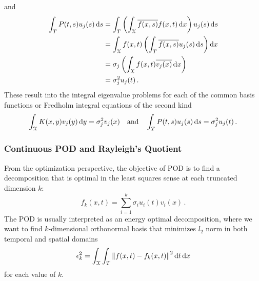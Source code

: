 \documentclass[10pt]{article}
\newcommand{\norm}[1]{\left\Vert#1\right\Vert}
\begin{document}
and
\begin{equation}
\begin{aligned}
    \int_T  P(t,s) {u_j(s)}\, \mathrm{d} s 
    & = 
    \int_T 
    \left(
    \int_{\cal X} \overline{f(x,s)} f(x,t)\, \mathrm{d}x 
    \right) 
    {u_j(s)}\, \mathrm{d} s\\
    & = 
    \int_{\cal X} {f(x,t)}
    \left( 
    \int_T \overline{f(x,s)} u_j(s) \, \mathrm{d} s
    \right) 
    \mathrm{d} x\\
    & = \sigma_{j} \left(
    \int_{\cal X} {f(x,t)}
     \overline{v_j(x)}\, \mathrm{d} x\right)\\
    & =\sigma_{j}^2 u_j(t)\,.
\end{aligned}
\end{equation}
These result into the integral eigenvalue problems for each of the common basis functions or Fredholm integral equations of the second kind
\begin{equation}
    \int_{\cal X} 
    K(x,y) {v_j(y)}\, \mathrm{d} y = \sigma_{j}^2 v_j(x)
\quad \mathrm{and} \quad 
    \int_T 
    P(t,s) {u_j(s)}\, \mathrm{d} s = \sigma_{j}^2 u_j(t)\,.
\end{equation}

\subsubsection{Continuous POD and Rayleigh's Quotient}
From the optimization perspective, the objective of POD is to find a decomposition that is optimal in the least squares sense at each truncated dimension $k$:
\begin{equation}\label{ROfield}
f_k({x},t) = \sum_{i=1}^{k} \sigma_{i} u_i(t)
v_i({x})\,.
\end{equation}
The POD is usually interpreted as an energy optimal decomposition, where we want to find $k$-dimensional orthonormal basis that minimizes $l_2$ norm in both temporal and spatial domains 
\begin{equation}
\epsilon_k^2 = \int_{\cal X} \int_T \norm{f(x,t)-f_k(x,t)}^2 \mathrm{d}t \, \mathrm{d}x
\end{equation} 
for each value of $k$.
\end{document}
